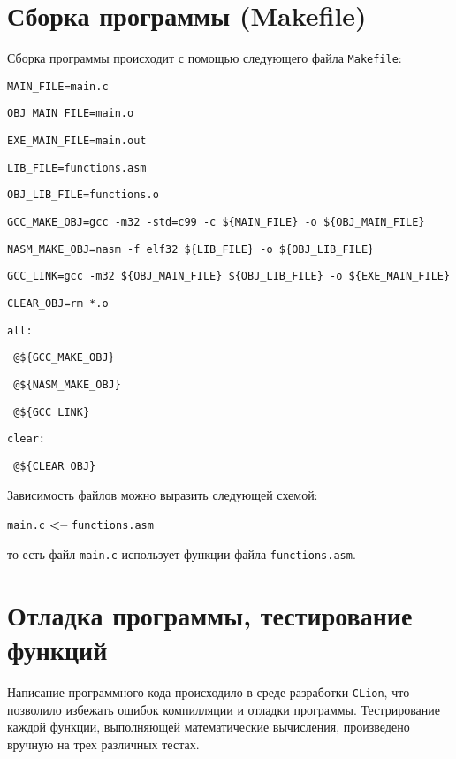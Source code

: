 \documentclass[a4paper,12pt,titlepage,finall]{article}
\begin{document}
\newpage

\section{Сборка программы (Makefile)}

Сборка программы происходит с помощью следующего файла \texttt{Makefile}:
\newline

\texttt{MAIN\_FILE=main.c}

\texttt{OBJ\_MAIN\_FILE=main.o}

\texttt{EXE\_MAIN\_FILE=main.out}
\newline

\texttt{LIB\_FILE=functions.asm}

\texttt{OBJ\_LIB\_FILE=functions.o}
\newline

\texttt{GCC\_MAKE\_OBJ=gcc -m32 -std=c99 -c \$\{MAIN\_FILE\} -o \$\{OBJ\_MAIN\_FILE\}}

\texttt{NASM\_MAKE\_OBJ=nasm -f elf32 \$\{LIB\_FILE\} -o \$\{OBJ\_LIB\_FILE\}}

\texttt{GCC\_LINK=gcc -m32 \$\{OBJ\_MAIN\_FILE\} \$\{OBJ\_LIB\_FILE\} -o \$\{EXE\_MAIN\_FILE\}}

\texttt{CLEAR\_OBJ=rm *.o}
\newline

\texttt{all:}

\texttt{	@\$\{GCC\_MAKE\_OBJ\}}

\texttt{	@\$\{NASM\_MAKE\_OBJ\}}

\texttt{	@\$\{GCC\_LINK\}}
\newline

\texttt{clear:}

\texttt{	@\$\{CLEAR\_OBJ\}}
\newline

Зависимость файлов можно выразить следующей схемой:

\texttt{main.c} \textbf{<--} \texttt{functions.asm}

то есть файл \texttt{main.c} использует функции файла \texttt{functions.asm}.

\newpage

\section{Отладка программы, тестирование функций}
Написание программного кода происходило в среде разработки \texttt{CLion}, что позволило избежать ошибок компилляции и отладки программы. Тестрирование каждой функции, выполняющей математические вычисления, произведено вручную на трех различных тестах. 
\end{document}
